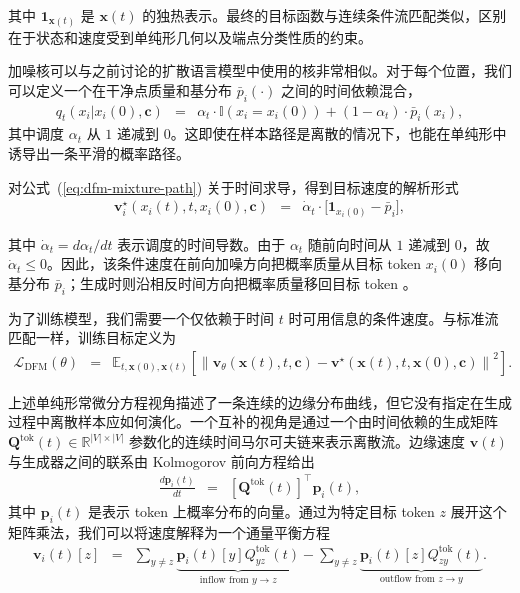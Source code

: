 \noindent 其中 $\mathbf{1}_{\mathbf{x}(t)}$ 是 $\mathbf{x}(t)$ 的独热表示。最终的目标函数与连续条件流匹配类似，区别在于状态和速度受到单纯形几何以及端点分类性质的约束。

加噪核可以与之前讨论的扩散语言模型中使用的核非常相似。对于每个位置，我们可以定义一个在干净点质量和基分布 $\bar{p}_i(\cdot)$ 之间的时间依赖混合，
\begin{eqnarray}
q_t(x_i | x_i(0), \mathbf{c})
& = &
\alpha_t \cdot \mathbb{I}(x_i = x_i(0))
+
(1-\alpha_t) \cdot \bar{p}_i(x_i),
\label{eq:dfm-mixture-path}
\end{eqnarray}
其中调度 $\alpha_t$ 从 $1$ 递减到 $0$。这即使在样本路径是离散的情况下，也能在单纯形中诱导出一条平滑的概率路径。

对公式~(\ref{eq:dfm-mixture-path}) 关于时间求导，得到目标速度的解析形式
\begin{eqnarray}
\mathbf{v}^\star_i(x_i(t), t, x_i(0), \mathbf{c})
& = &
\dot{\alpha}_t \cdot \big[ \mathbf{1}_{x_i(0)} - \bar{p}_i \big],
\label{eq:dfm-analytic-velocity}
\end{eqnarray}

\noindent 其中 $\dot{\alpha}_t = d\alpha_t/dt$ 表示调度的时间导数。由于 $\alpha_t$ 随前向时间从 $1$ 递减到 $0$，故 $\dot{\alpha}_t\leq 0$。因此，该条件速度在前向加噪方向把概率质量从目标 token $x_i(0)$ 移向基分布 $\bar{p}_i$；生成时则沿相反时间方向把概率质量移回目标 token 。

为了训练模型，我们需要一个仅依赖于时间 $t$ 时可用信息的条件速度。与标准流匹配一样，训练目标定义为
\begin{eqnarray}
\mathcal{L}_{\text{DFM}}(\theta)
& = &
\mathbb{E}_{t, \mathbf{x}(0), \mathbf{x}(t)} \left[ \left\| \mathbf{v}_\theta(\mathbf{x}(t), t, \mathbf{c}) - \mathbf{v}^\star(\mathbf{x}(t), t, \mathbf{x}(0), \mathbf{c}) \right\|^2 \right].
\label{eq:dfm-objective}
\end{eqnarray}

上述单纯形常微分方程视角描述了一条连续的边缘分布曲线，但它没有指定在生成过程中离散样本应如何演化。一个互补的视角是通过一个由时间依赖的生成矩阵 $\mathbf{Q}^{\mathrm{tok}}(t) \in \mathbb{R}^{|V| \times |V|}$ 参数化的连续时间马尔可夫链来表示离散流。边缘速度 $\mathbf{v}(t)$ 与生成器之间的联系由 Kolmogorov 前向方程给出
\begin{eqnarray}
\frac{d\mathbf{p}_i(t)}{dt} & = & \left[ \mathbf{Q}^{\mathrm{tok}}(t) \right]^\top \mathbf{p}_i(t),
\label{eq:kolmogorov-forward}
\end{eqnarray}
其中 $\mathbf{p}_i(t)$ 是表示 token 上概率分布的向量。通过为特定目标 token $z$ 展开这个矩阵乘法，我们可以将速度解释为一个通量平衡方程
\begin{eqnarray}
\mathbf{v}_i(t)[z]
& = &
\sum_{y \neq z} \underbrace{\mathbf{p}_i(t)[y] Q^{\mathrm{tok}}_{yz}(t)}_{\text{inflow from } y \to z}
-
\sum_{y \neq z} \underbrace{\mathbf{p}_i(t)[z] Q^{\mathrm{tok}}_{zy}(t)}_{\text{outflow from } z \to y}.
\label{eq:master-equation-Q}
\end{eqnarray}

